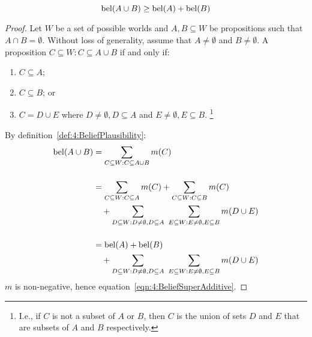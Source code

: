 \begin{thm}
  \begin{equation}
    \label{eqn:4:BeliefSuperAdditive}
    \operatorname*{bel}(A \cup B) \geq \operatorname*{bel}(A) + \operatorname*{bel}(B)
  \end{equation}

  \begin{proof}
    Let $W$ be a set of possible worlds and $A, B \subseteq W$ be propositions
    such that $A \cap B = \emptyset$.
    Without loss of generality, assume that $A \neq \emptyset$ and
    $B \neq \emptyset$.
    A proposition $C \subseteq W : C \subseteq A \cup B$ if and only if:
    \begin{enumerate}
      \item $C \subseteq A$;
      \item $C \subseteq B$; or
      \item $C = D \cup E$ where $D \neq \emptyset, D \subseteq A$ and
            $E \neq \emptyset, E \subseteq B$.
            \footnote{
              I.e., if $C$ is not a subset of $A$ or $B$, then $C$ is the union of
              sets $D$ and $E$ that are subsets of $A$ and $B$ respectively.
            }
    \end{enumerate}
    By definition~\ref{def:4:BeliefPlausibility}:
    \begin{align*}
      \operatorname*{bel}(A \cup B)
       & = \sum_{C \subseteq W : C \subseteq A \cup B} m(C)              \\[3ex]
       & = \sum_{C \subseteq W : C \subseteq A} m(C)
      + \sum_{C \subseteq W : C \subseteq B} m(C)                        \\
       & \quad + \sum_{D \subseteq W : D \neq \emptyset, D \subseteq A}\
      \sum_{E \subseteq W : E \neq \emptyset, E \subseteq B}
      m(D \cup E)                                                        \\[3ex]
       & = \operatorname*{bel}(A) + \operatorname*{bel}(B)                                             \\
       & \quad + \sum_{D \subseteq W : D \neq \emptyset, D \subseteq A}\
      \sum_{E \subseteq W : E \neq \emptyset, E \subseteq B} m(D \cup E)
    \end{align*}
    $m$ is non-negative, hence equation~\ref{eqn:4:BeliefSuperAdditive}.
  \end{proof}
\end{thm}

